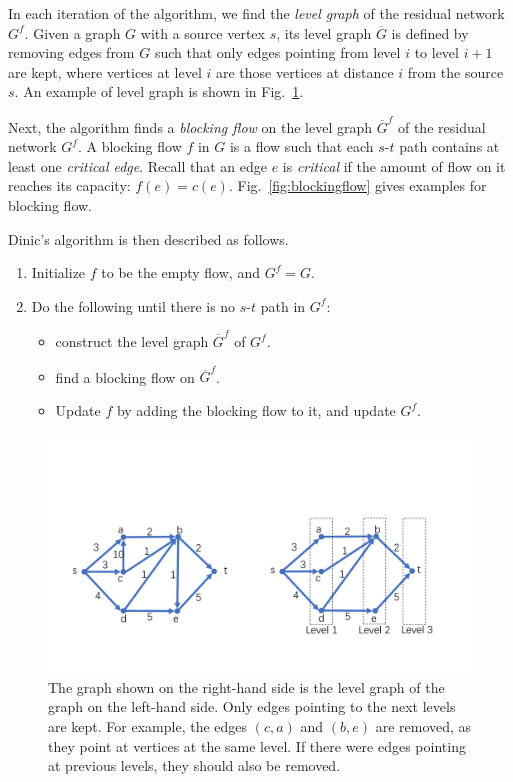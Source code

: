 \documentclass{oxmathproblems}
\begin{document}
\begin{questions}
In each iteration of the algorithm, we find the \emph{level graph} of the residual network $G^f$.
Given a graph $G$ with a source vertex $s$, its level graph $\overline{G}$ is defined by removing edges from $G$ such that only edges pointing from level $i$ to level $i+1$ are kept, where vertices at level $i$ are those vertices at distance $i$ from the source $s$.
An example of level graph is shown in Fig.~\ref{fig:levelgraph}.

Next, the algorithm finds a \emph{blocking flow} on the level graph $\overline{G}^f$ of the residual network $G^f$.
A blocking flow $f$ in $G$ is a flow such that each $s$-$t$ path contains at least one \emph{critical edge}.
Recall that an edge $e$ is \emph{critical} if the amount of flow on it reaches its capacity: $f(e)=c(e)$.
Fig.~\ref{fig:blockingflow} gives examples for blocking flow.

Dinic's algorithm is then described as follows.
\begin{enumerate}
    \item Initialize $f$ to be the empty flow, and $G^f=G$.
    \item Do the following until there is no $s$-$t$ path in $G^f$:
    \begin{itemize}
        \item construct the level graph $\overline{G}^f$ of $G^f$.
        \item find a blocking flow on $\overline{G}^f$.
        \item Update $f$ by adding the blocking flow to it, and update $G^f$.
    \end{itemize}
\end{enumerate}

\begin{figure}[htbp]
    \centering
    \includegraphics[width=\textwidth]{levelgraph.pdf}
    \caption{The graph shown on the right-hand side is the level graph of the graph on the left-hand side. Only edges pointing to the next levels are kept. For example, the edges $(c,a)$ and $(b,e)$ are removed, as they point at vertices at the same level. If there were edges pointing at previous levels, they should also be removed.}
    \label{fig:levelgraph}
\end{figure}


\end{questions}
\end{document}
